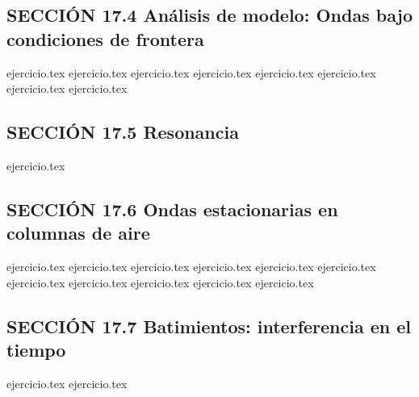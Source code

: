 \subsection*{SECCIÓN 17.4 Análisis de modelo: Ondas bajo condiciones de frontera}
\begin{enumerate}
    \setcounter{enumi}{10}
    {ejercicio.tex}
    {ejercicio.tex}
    {ejercicio.tex}
    {ejercicio.tex}
    {ejercicio.tex}
    {ejercicio.tex}
    {ejercicio.tex}
    {ejercicio.tex}
\end{enumerate}

\subsection*{SECCIÓN 17.5 Resonancia}
\begin{enumerate}
    \setcounter{enumi}{18}
    {ejercicio.tex}
\end{enumerate}

\subsection*{SECCIÓN 17.6 Ondas estacionarias en columnas de aire}
\begin{enumerate}
    \setcounter{enumi}{19}
    {ejercicio.tex}
    {ejercicio.tex}
    {ejercicio.tex}
    {ejercicio.tex}
    {ejercicio.tex}
    {ejercicio.tex}
    {ejercicio.tex}
    {ejercicio.tex}
    {ejercicio.tex}
    {ejercicio.tex}
    {ejercicio.tex}
\end{enumerate}

\subsection*{SECCIÓN 17.7 Batimientos: interferencia en el tiempo}
\begin{enumerate}
    \setcounter{enumi}{30}
    {ejercicio.tex}
    {ejercicio.tex}
\end{enumerate}

